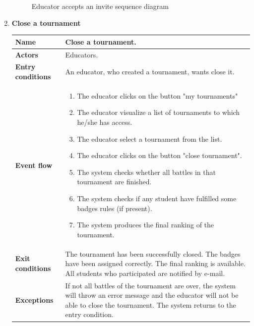 \begin{enumerate}[label=\textbf{UC.\arabic*}]
\begin{figure}[h]
            \caption{Educator accepts an invite sequence diagram}
            \label{fig:sd-acceptE}
        \end{figure}
        \clearpage
        \item {} \textbf{Close a tournament}
        \begin{table}[h]
    	    \centering
                \renewcommand{\arraystretch}{1.5}
                \begin{tabular}{|m{3.2cm}|m{9.8cm}|}
                    \hline
                    \textbf{Name} & Close a tournament. \\
                    \hline
                    \textbf{Actors} & Educators. \\
                    \hline
                    \textbf{Entry conditions}  &  An educator, who created a tournament, wants close it. \\
                    \hline
                    \textbf{Event flow}  & 
                    \begin{enumerate}[label=\arabic*.]
                        \item The educator clicks on the button "my tournaments"
                        \item The educator visualize a list of tournaments to which he/she has access.
                        \item The educator select a tournament from the list.
                        \item The educator clicks on the button "close tournament".
                        \item The system checks whether all battles in that tournament are finished.
                        \item The system checks if any student have fulfilled some badges rules (if present).
                        \item The system produces the final ranking of the tournament.
                    \end{enumerate}\\
                    \hline
                    \textbf{Exit conditions}  & The tournament has been successfully closed. The badges have been assigned correctly. The final ranking is available. All students who participated are notified by e-mail. \\
                    \hline
                    \textbf{Exceptions}  & If not all battles of the tournament are over, the system will throw an error message and the educator will not be able to close the tournament. The system returns to the entry condition.\\

\end{tabular}
\end{table}
\end{enumerate}
